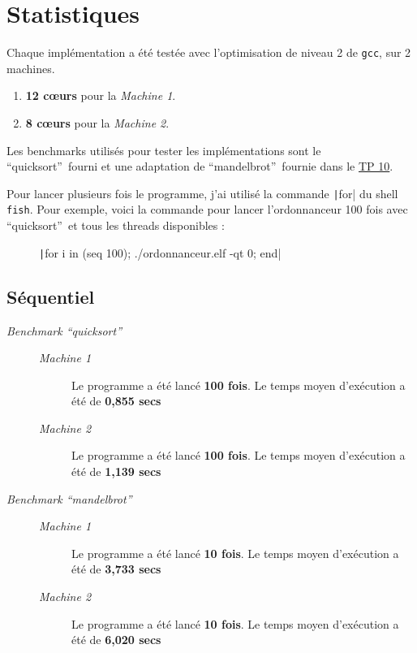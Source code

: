 \documentclass[a4paper]{article}
\def\coeur{c\oe{}ur}
\def\mone{\textit{Machine 1}} %
\def\mtwo{\textit{Machine 2}} %
\def\qs{\enquote{quicksort}}
\def\mandel{\enquote{mandelbrot}}
\def\bone{\textit{Benchmark \qs}}
\def\btwo{\textit{Benchmark \mandel}}
\begin{document}
\section{Statistiques}\label{sec:stats}

Chaque implémentation a été testée avec l'optimisation de niveau 2
de \texttt{gcc}, sur 2 machines.

\begin{enumerate}
  \item \textbf{12 \coeur{}s} pour la \mone.
  \item \textbf{8 \coeur{}s} pour la \mtwo.
\end{enumerate}

Les benchmarks utilisés pour tester les implémentations sont le \qs~fourni
et une adaptation de \mandel~fournie dans le
\href{https://www.irif.fr/~jch/enseignement/systeme/tp10.pdf}{TP 10}.

Pour lancer plusieurs fois le programme, j'ai utilisé la commande
\texttt|for| du shell \texttt{fish}. Pour exemple, voici la commande
pour lancer l'ordonnanceur 100 fois avec \qs~et tous les threads disponibles :

\begin{figure}[H]
  \centering
  \texttt|for i in (seq 100); ./ordonnanceur.elf -qt 0; end|
\end{figure}

\subsection{Séquentiel}\label{stats:seq}
\begin{description}
  \item[\bone] \hspace{1em}
        \begin{description}
          \item[\mone] Le programme a été lancé \textbf{100 fois}.
                Le temps moyen d'exécution a été de \textbf{0,855 secs}
          \item[\mtwo] Le programme a été lancé \textbf{100 fois}.
                Le temps moyen d'exécution a été de \textbf{1,139 secs}
        \end{description}

  \item[\btwo] \hspace{1em}
        \begin{description}
          \item[\mone] Le programme a été lancé \textbf{10 fois}.
                Le temps moyen d'exécution a été de \textbf{3,733 secs}
          \item[\mtwo] Le programme a été lancé \textbf{10 fois}.
                Le temps moyen d'exécution a été de \textbf{6,020 secs}
        \end{description}
\end{description}
\end{document}
